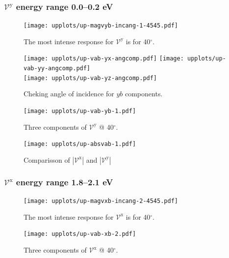 \documentclass[twocolumn]{article}
\let\Oldsubsubsection\subsubsection
\renewcommand{\subsubsection}{\FloatBarrier\Oldsubsubsection}
\begin{document}

\subsubsection{$\mathcal{V}^{\mathrm{y}}$ energy range 0.0--0.2 eV }
\begin{figure}[h]
    \centering
    \texttt{[image: upplots/up-magvyb-incang-1-4545.pdf]}
    \caption{The most intense response for $\mathcal{V}^{\mathrm{y}} $ is for 
    40$^{\circ}$.}
    \label{fig:up-magvybincang1}
\end{figure}
\begin{figure}[ht]
    \centering
    \texttt{[image: upplots/up-vab-yx-angcomp.pdf]}
    \texttt{[image: upplots/up-vab-yy-angcomp.pdf]}\\
    \texttt{[image: upplots/up-vab-yz-angcomp.pdf]}
    \caption{Cheking angle of incidence for $yb$ components.}
    \label{fig:up-ybangcomp}
\end{figure}
\begin{figure}[ht]
    \centering
    \texttt{[image: upplots/up-vab-yb-1.pdf]}
    \caption{Three components of $\mathcal{V}^{\mathrm{y}} $ @ 40$^{\circ}$.}
    \label{fig:up-vyb1}
\end{figure}

\begin{figure}[ht]
    \centering
    \texttt{[image: upplots/up-absvab-1.pdf]}
    \caption{Comparisson of $|\mathcal{V}^{\mathrm{x}}|$ and $|\mathcal{V}^{\mathrm{y}}|$}    
    \label{fig:up-xbybcomp-1}
\end{figure}


\subsubsection{$\mathcal{V}^{\mathrm{x}}$ energy range 1.8--2.1 eV }


\begin{figure}[h]
    \centering
    \texttt{[image: upplots/up-magvxb-incang-2-4545.pdf]}
    \caption{The most intense response for $\mathcal{V}^{\mathrm{x}} $ is for 
    40$^{\circ}$.}
    \label{fig:up-magxbincang2}
\end{figure}
\begin{figure}[h]
    \centering
    \texttt{[image: upplots/up-vab-xb-2.pdf]}
    \caption{Three components of $\mathcal{V}^{\mathrm{x}} $ @ 40$^{\circ}$.}
    \label{fig:up-vxb2}
\end{figure}
\end{document}
